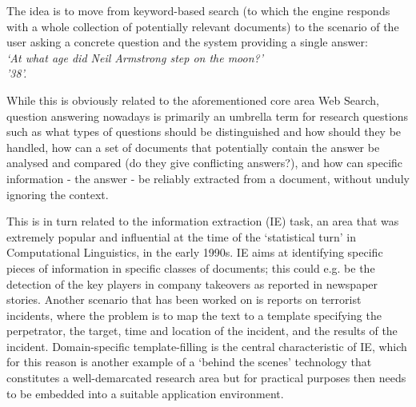 \documentclass[]{../../metanetpaper}
\begin{document}
\begin{multicols}{2}
The idea is to move from keyword-based search (to which the engine responds with a whole collection of potentially relevant documents) to the scenario of the user asking a concrete question and the system providing a single answer: \\
\textit{‘At what age did Neil Armstrong step on the moon?’}\\
\textit{’38’.}

While this is obviously related to the aforementioned core area Web Search, question answering nowadays is primarily an umbrella term for research questions such as what types of questions should be distinguished and how should they be handled, how can a set of documents that potentially contain the answer be analysed and compared (do they give conflicting answers?), and how can specific information - the answer - be reliably extracted from a document, without unduly ignoring the context. 

This is in turn related to the information extraction (IE) task, an area that was extremely popular and influential at the time of the ‘statistical turn’ in Computational Linguistics, in the early 1990s. IE aims at identifying specific pieces of information in specific classes of documents; this could e.g. be the detection of the key players in company takeovers as reported in newspaper stories. Another scenario that has been worked on is reports on terrorist incidents, where the problem is to map the text to a template specifying the perpetrator, the target, time and location of the incident, and the results of the incident. Domain-specific template-filling is the central characteristic of IE, which for this reason is another example of a ‘behind the scenes’ technology that constitutes a well-demarcated research area but for practical purposes then needs to be embedded into a suitable application environment. 


\end{multicols}
\end{document}
